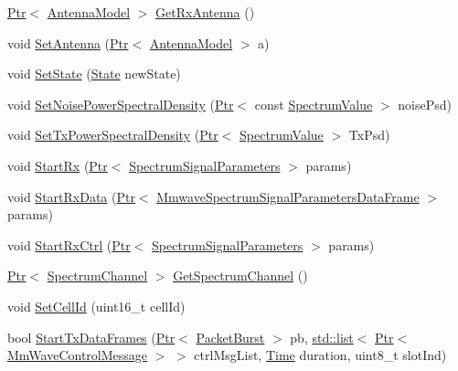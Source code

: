 \begin{DoxyCompactItemize}
\item 
\hyperlink{classns3_1_1Ptr}{Ptr}$<$ \hyperlink{classns3_1_1AntennaModel}{Antenna\+Model} $>$ \hyperlink{classns3_1_1MmWaveSpectrumPhy_aae4d68a0eba2e77c4870ab9a2c82bbe2}{Get\+Rx\+Antenna} ()
\item 
void \hyperlink{classns3_1_1MmWaveSpectrumPhy_ae6acf43b3517c4041ee6a8d2e3017c0a}{Set\+Antenna} (\hyperlink{classns3_1_1Ptr}{Ptr}$<$ \hyperlink{classns3_1_1AntennaModel}{Antenna\+Model} $>$ a)
\item 
void \hyperlink{classns3_1_1MmWaveSpectrumPhy_a9e999e7d55a9ef65e0309cba2039d865}{Set\+State} (\hyperlink{classns3_1_1MmWaveSpectrumPhy_a665335f60416cf031a9b68209e4368ae}{State} new\+State)
\item 
void \hyperlink{classns3_1_1MmWaveSpectrumPhy_a768d85668820a94ebdb09c916e31e1be}{Set\+Noise\+Power\+Spectral\+Density} (\hyperlink{classns3_1_1Ptr}{Ptr}$<$ const \hyperlink{classns3_1_1SpectrumValue}{Spectrum\+Value} $>$ noise\+Psd)
\item 
void \hyperlink{classns3_1_1MmWaveSpectrumPhy_a09e80ccf9ca462347f003868c44d8966}{Set\+Tx\+Power\+Spectral\+Density} (\hyperlink{classns3_1_1Ptr}{Ptr}$<$ \hyperlink{classns3_1_1SpectrumValue}{Spectrum\+Value} $>$ Tx\+Psd)
\item 
void \hyperlink{classns3_1_1MmWaveSpectrumPhy_ab4e138db0344c04c7a6b4cb48c0cf3b8}{Start\+Rx} (\hyperlink{classns3_1_1Ptr}{Ptr}$<$ \hyperlink{structns3_1_1SpectrumSignalParameters}{Spectrum\+Signal\+Parameters} $>$ params)
\item 
void \hyperlink{classns3_1_1MmWaveSpectrumPhy_a7e46417700c6917e5f5e7d719f756746}{Start\+Rx\+Data} (\hyperlink{classns3_1_1Ptr}{Ptr}$<$ \hyperlink{structns3_1_1MmwaveSpectrumSignalParametersDataFrame}{Mmwave\+Spectrum\+Signal\+Parameters\+Data\+Frame} $>$ params)
\item 
void \hyperlink{classns3_1_1MmWaveSpectrumPhy_aa38238539e853af2c45c3b1da5bd77af}{Start\+Rx\+Ctrl} (\hyperlink{classns3_1_1Ptr}{Ptr}$<$ \hyperlink{structns3_1_1SpectrumSignalParameters}{Spectrum\+Signal\+Parameters} $>$ params)
\item 
\hyperlink{classns3_1_1Ptr}{Ptr}$<$ \hyperlink{classns3_1_1SpectrumChannel}{Spectrum\+Channel} $>$ \hyperlink{classns3_1_1MmWaveSpectrumPhy_aca1a7c9d6160f64ed4434bad01d37809}{Get\+Spectrum\+Channel} ()
\item 
void \hyperlink{classns3_1_1MmWaveSpectrumPhy_acb548c8724ad3601311f414ab492f662}{Set\+Cell\+Id} (uint16\+\_\+t cell\+Id)
\item 
bool \hyperlink{classns3_1_1MmWaveSpectrumPhy_ad89227a1246f9e429f37b5c8284ec318}{Start\+Tx\+Data\+Frames} (\hyperlink{classns3_1_1Ptr}{Ptr}$<$ \hyperlink{classns3_1_1PacketBurst}{Packet\+Burst} $>$ pb, \hyperlink{openflow-interface_8h_afd9bcfa176617760671b67580f536fa7}{std\+::list}$<$ \hyperlink{classns3_1_1Ptr}{Ptr}$<$ \hyperlink{classns3_1_1MmWaveControlMessage}{Mm\+Wave\+Control\+Message} $>$ $>$ ctrl\+Msg\+List, \hyperlink{classns3_1_1Time}{Time} duration, uint8\+\_\+t slot\+Ind)

\end{DoxyCompactItemize}

